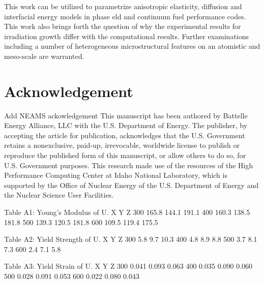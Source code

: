\documentclass[review]{elsarticle}
\begin{document}
This work can be utilized to parametrize anisotropic elasticity, diffusion and interfacial energy models
in phase eld and continuum fuel performance codes. This work also brings forth the question of why the
experimental results for irradiation growth differ with the computational results. Further examinations
including a number of heterogeneous microstructural features on an atomistic and meso-scale are warranted.

\section{Acknowledgement}

Add NEAMS ackowledgement This manuscript has been authored by Battelle Energy Alliance, LLC with
the U.S. Department of Energy. The publisher, by accepting the article for publication, acknowledges that
the U.S. Government retains a nonexclusive, paid-up, irrevocable, worldwide license to publish or reproduce
the published form of this manuscript, or allow others to do so, for U.S. Government purposes. This research
made use of the resources of the High Performance Computing Center at Idaho National Laboratory, which
is supported by the Office of Nuclear Energy of the U.S. Department of Energy and the Nuclear Science
User Facilities.

\FloatBarrier


Table A1: Young's Modulus of U.
X Y Z
300 165.8 144.1 191.1
400 160.3 138.5 181.8
500 139.3 120.5 181.8
600 109.5 119.4 175.5

Table A2: Yield Strength of  U.
X Y Z
300 5.8 9.7 10.3
400 4.8 8.9 8.8
500 3.7 8.1 7.3
600 2.4 7.1 5.8

Table A3: Yield Strain of U.
X Y Z
300 0.041 0.093 0.063
400 0.035 0.090 0.060
500 0.028 0.091 0.053
600 0.022 0.080 0.043



\end{document}
